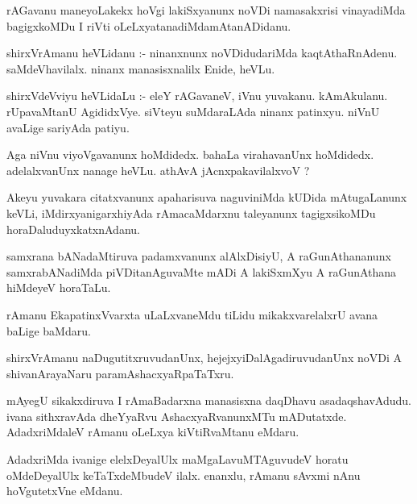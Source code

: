 \documentclass{article}
\begin{document}
\begin{mn}
rAGavanu  maneyoLakekx  hoVgi  lakiSxyanunx  noVDi namasakxrisi  vinayadiMda  bagigxkoMDu  I riVti  oLeLxyatanadiMdamAtanADidanu.
\end{mn}

\begin{mn}
shirxVrAmanu  heVLidanu :- ninanxnunx  noVDidudariMda  kaqtAthaRnAdenu.  saMdeVhavilalx.  ninanx  manasisxnalilx  Enide,  heVLu.
\end{mn}

\begin{mn}
shirxVdeVviyu  heVLidaLu :- eleY  rAGavaneV,  iVnu  yuvakanu.  kAmAkulanu. rUpavaMtanU  AgididxVye.  siVteyu  suMdaraLAda  ninanx  
patinxyu.  niVnU  avaLige  sariyAda   patiyu.
\end{mn}

\begin{mn}
Aga  niVnu  viyoVgavanunx  hoMdidedx.  bahaLa  virahavanUnx hoMdidedx.  adelalxvanUnx  nanage  heVLu.  athAvA  jAcnxpakavilalxvoV ?
\end{mn}

\begin{mn}
Akeyu  yuvakara  citatxvanunx  apaharisuva  naguviniMda  kUDida  mAtugaLanunx  keVLi,  iMdirxyanigarxhiyAda  rAmacaMdarxnu  
taleyanunx  tagigxsikoMDu  horaDaluduyxkatxnAdanu.
\end{mn}

\begin{mn}
samxrana  bANadaMtiruva  padamxvanunx  alAlxDisiyU,  A  raGunAthananunx  samxrabANadiMda  piVDitanAguvaMte  mADi  A  lakiSxmXyu  
A  raGunAthana  hiMdeyeV  horaTaLu.
\end{mn}

\begin{mn}
rAmanu  EkapatinxVvarxta  uLaLxvaneMdu  tiLidu  mikakxvarelalxrU  avana  baLige  baMdaru.
\end{mn}

\begin{mn}
shirxVrAmanu  naDugutitxruvudanUnx,  hejejxyiDalAgadiruvudanUnx  noVDi  A  shivanArayaNaru  paramAshacxyaRpaTaTxru.
\end{mn}

\begin{mn}
mAyegU  sikakxdiruva  I  rAmaBadarxna  manasisxna  daqDhavu  asadaqshavAdudu.  ivana  sithxravAda  dheYyaRvu  
AshacxyaRvanunxMTu mADutatxde.  AdadxriMdaleV  rAmanu  oLeLxya  kiVtiRvaMtanu  eMdaru.
\end{mn}

\begin{mn}
AdadxriMda  ivanige  elelxDeyalUlx  maMgaLavuMTAguvudeV  horatu  oMdeDeyalUlx  keTaTxdeMbudeV  ilalx.  enanxlu,  
rAmanu  sAvxmi  nAnu  hoVgutetxVne  eMdanu.
\end{mn}
\end{document}
